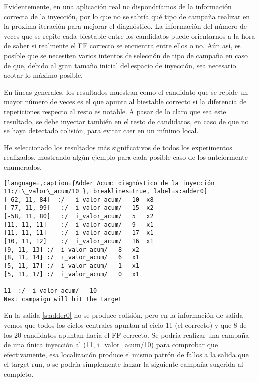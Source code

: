 Evidentemente, en una aplicación real no dispondríamos de la información correcta
de la inyección, por lo que no se sabría qué tipo de campaña realizar en la
proxima iteración para mejorar el diagnóstico. La información del número de veces
que se repite cada biestable entre los candidatos puede orientarnos a la hora de
saber si realmente el \gls{FF} correcto se encuentra entre ellos o no. Aún
así, es posible que se necesiten varios intentos de selección de tipo de campaña
en caso de que, debido al gran tamaño inicial del espacio de inyección, sea
necesario acotar lo máximo posible.

En líneas generales, los resultados muestran como el candidato que se repide un
mayor número de veces es el que apunta al biestable correcto si la diferencia
de repeticiones respecto al resto es notable. A pasar de lo claro
que sea este resultado, se debe inyectar también en el resto de candidatos, en caso
de que no se haya detectado colisión, para evitar caer en un mínimo local.

He seleccionado los resultados más significativos de todos los experimentos
realizados, mostrando algún ejemplo para cada posible caso de los anteiormente
enumerados.

\begin{lstlisting}[language=,caption={Adder Acum: diagnóstico de la inyección
11:/i\_valor\_acum/10 }, breaklines=true, label=s:adder0]
[-62, 11, 84]  :/	i_valor_acum/	10	x8
[-77, 11, 99]	:/	i_valor_acum/	15	x2
[-58, 11, 80]	:/	i_valor_acum/	5	x2
[11, 11, 11]	:/	i_valor_acum/	9	x1
[11, 11, 11]	:/	i_valor_acum/	17	x1
[10, 11, 12]	:/	i_valor_acum/	16	x1
[9, 11, 13]	:/	i_valor_acum/	8	x2
[8, 11, 14]	:/	i_valor_acum/	6	x1
[5, 11, 17]	:/	i_valor_acum/	1	x1
[5, 11, 17]	:/	i_valor_acum/	0	x1

11	:/	i_valor_acum/	10
Next campaign will hit the target
\end{lstlisting}

En la salida \ref{s:adder0} no se produce colisión, pero en la información de 
salida vemos que todos los ciclos centrales apuntan al ciclo 11 (el correcto) y 
que 8 de los 20 candidatos apuntan hacia el \gls{FF} correcto.
Se podría realizar una campaña de una única inyección al (11, i\_valor\_acum/10) 
para comprobar que efectivamente, esa localización produce el mismo patrón de
fallos a la salida que el target run, o se podría simplemente lanzar la siguiente
campaña sugerida al completo.

